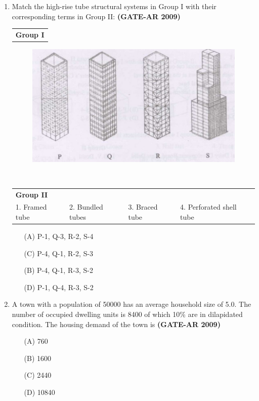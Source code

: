\documentclass[a4paper,10pt]{article}
\begin{document}
\begin{enumerate}
    \item Match the high-rise tube structural systems in Group I with their corresponding terms in Group II: \hfill \textbf{(GATE-AR 2009)} \\
    \begin{tabular}{ p }
	\textbf{Group I} \\
	\end{tabular}
	\begin{figure}[h!]
        \centering
        \includegraphics[width=0.5\linewidth]{figs/img_02.jpg}
        \label{fig:Img02}
	\end{figure} \\
	\begin{tabular}{ p p p p }
	\textbf{Group II} & & & \\
	1. Framed tube & 2. Bundled tubes & 3. Braced tube & 4. Perforated shell tube \\
	\end{tabular}
	\begin{multicols}{2}
	\begin{itemize}
        \item[(A)] P-1, Q-3, R-2, S-4
        \item[(C)] P-4, Q-1, R-2, S-3
        \item[(B)] P-4, Q-1, R-3, S-2
        \item[(D)] P-1, Q-4, R-3, S-2
    \end{itemize}
	\end{multicols}

    \item A town with a population of 50000 has an average household size of 5.0. The number of occupied dwelling units is 8400 of which 10\% are in dilapidated condition. The housing demand of the town is \hfill \textbf{(GATE-AR 2009)}
    \begin{multicols}{4}
	\begin{itemize}
        \item[(A)] 760
        \item[(B)] 1600
        \item[(C)] 2440
        \item[(D)] 10840
    \end{itemize}
	\end{multicols}


\end{enumerate}
\end{document}
